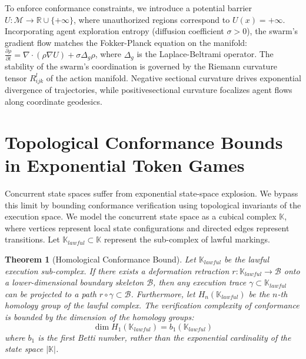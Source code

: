 \documentclass[11pt,oneside]{book}
\theoremstyle{definition}
\theoremstyle{plain}
\newtheorem{theorem}{Theorem}[chapter]
\theoremstyle{remark}
\begin{document}
To enforce conformance constraints, we introduce a potential barrier $U: \mathcal{M} \to \mathbb{R} \cup \{+\infty\}$, where unauthorized regions correspond to $U(x) = +\infty$. %
Incorporating agent exploration entropy (diffusion coefficient $\sigma > 0$), the swarm's gradient flow matches the Fokker-Planck equation on the manifold: $\frac{\partial \rho}{\partial t} = \nabla \cdot (\rho \nabla U) + \sigma \Delta_g \rho$, where $\Delta_g$ is the Laplace-Beltrami operator. %
The stability of the swarm's coordination is governed by the Riemann curvature tensor $R^l_{ijk}$ of the action manifold. %
Negative sectional curvature drives exponential divergence of trajectories, while positivesectional curvature focalizes agent flows along coordinate geodesics. %

\section{Topological Conformance Bounds in Exponential Token Games}
Concurrent state spaces suffer from exponential state-space explosion. %
We bypass this limit by bounding conformance verification using topological invariants of the execution space. %
We model the concurrent state space as a cubical complex $\mathbb{K}$, where vertices represent local state configurations and directed edges represent transitions. %
Let $\mathbb{K}_{lawful} \subset \mathbb{K}$ represent the sub-complex of lawful markings. %

\begin{theorem}[Homological Conformance Bound]\label{thm:homology_bound}
Let $\mathbb{K}_{lawful}$ be the lawful execution sub-complex. %
If there exists a deformation retraction $r: \mathbb{K}_{lawful} \to \mathcal{B}$ onto a lower-dimensional boundary skeleton $\mathcal{B}$, then any execution trace $\gamma \subset \mathbb{K}_{lawful}$ can be projected to a path $r \circ \gamma \subset \mathcal{B}$. %
Furthermore, let $H_n(\mathbb{K}_{lawful})$ be the $n$-th homology group of the lawful complex. %
The verification complexity of conformance is bounded by the dimension of the homology groups:
\[
\dim H_1(\mathbb{K}_{lawful}) = b_1(\mathbb{K}_{lawful})
\]
where $b_1$ is the first Betti number, rather than the exponential cardinality of the state space $|\mathbb{K}|$. %
\end{theorem}
\end{document}
